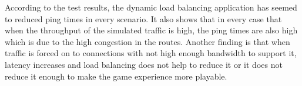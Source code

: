\newline
\par
According to the test results, the dynamic load balancing application has seemed to reduced ping times in every scenario. It also shows that in every case that when the throughput of the simulated traffic is high, the ping times are also high which is due to the high congestion in the routes. Another finding is that when traffic is forced on to connections with not high enough bandwidth to support it, latency increases and load balancing does not help to reduce it or it does not reduce it enough to make the game experience more playable.